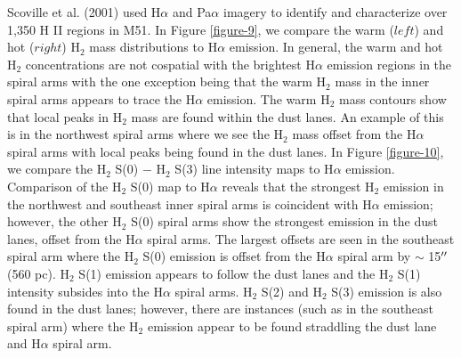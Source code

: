 \documentclass[manuscript]{aastex}
\begin{document}
Scoville et al. (2001) used H$\alpha$ and Pa$\alpha$ imagery to 
identify and characterize over 1,350 H II regions in M51.  In Figure 
\ref{figure-9}, we compare the warm ($left$) and hot ($right$)
$\mathrm{H_2}$ mass distributions to H$\alpha$ emission.  In general,
the warm and hot $\mathrm{H_2}$ concentrations are not cospatial with
the brightest H$\alpha$ emission regions in the spiral arms with the one
exception being that the warm $\mathrm{H_2}$ mass in the inner spiral
arms appears to trace the H$\alpha$ emission.  The warm $\mathrm{H_2}$
mass contours show that local peaks in $\mathrm{H_2}$ mass are found
within the dust lanes.  An example of this is in the northwest spiral
arms where we see the $\mathrm{H_2}$ mass offset from the H$\alpha$
spiral arms with local peaks being found in the dust lanes.
In Figure \ref{figure-10}, we compare the $\mathrm{H_2}$ S(0) $-$
$\mathrm{H_2}$ S(3) line intensity maps to H$\alpha$ emission.
Comparison of the $\mathrm{H_2}$ S(0) map to H$\alpha$ reveals that
the strongest $\mathrm{H_2}$ emission in the northwest and southeast
inner spiral arms is coincident with H$\alpha$ emission; however, the
other $\mathrm{H_2}$ S(0) spiral arms show the strongest emission in
the dust lanes, offset from the H$\alpha$ spiral arms.  The largest
offsets are seen in the southeast spiral arm where the $\mathrm{H_2}$
S(0) emission is offset from the H$\alpha$ spiral arm by $\sim$
15$\mbox{$^{\prime\prime}$}$ (560 pc).  $\mathrm{H_2}$ S(1) emission appears to follow
the dust lanes and the $\mathrm{H_2}$ S(1) intensity subsides into the
H$\alpha$ spiral arms.  $\mathrm{H_2}$ S(2) and $\mathrm{H_2}$ S(3)
emission is also found in the dust lanes; however, there are instances
(such as in the southeast spiral arm) where the $\mathrm{H_2}$
emission appear to be found straddling the dust lane and H$\alpha$
spiral arm.
\end{document}
